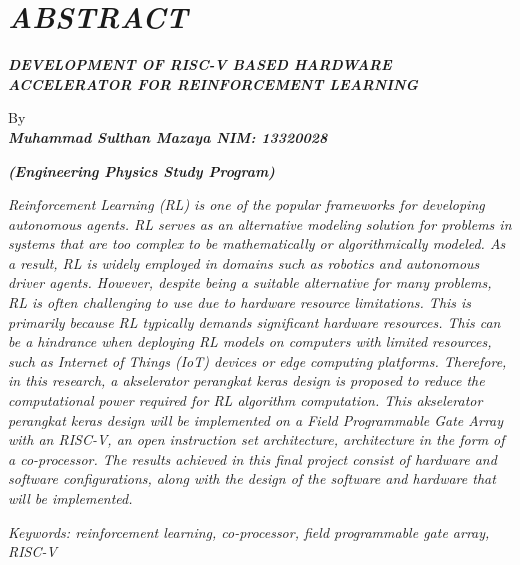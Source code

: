 \clearpage
\chapter*{\textit{ABSTRACT}}

\begin{center}
	\begin{singlespace}
		\center
		\large\bfseries\MakeUppercase{\textit{DEVELOPMENT OF RISC-V BASED HARDWARE ACCELERATOR FOR REINFORCEMENT LEARNING}}
		
		\normalfont\normalsize
		
		By\\
		\bfseries{\textit{Muhammad Sulthan Mazaya \hspace{5mm} NIM: 13320028}}
		
		\vspace{5mm}
		\large\bfseries{\textit{(Engineering Physics Study Program)}}
		\vspace{5mm}
	\end{singlespace}
\end{center}


\begin{singlespace}
	\small
	\textit{Reinforcement Learning (RL) is one of the popular frameworks for developing
		autonomous agents. RL serves as an alternative modeling solution for problems in
		systems that are too complex to be mathematically or algorithmically modeled. As
		a result, RL is widely employed in domains such as robotics and autonomous driver
		agents. However, despite being a suitable alternative for many problems, RL is
		often challenging to use due to hardware resource limitations. This is primarily
		because RL typically demands significant hardware resources. This can be a
		hindrance when deploying RL models on computers with limited resources, such as
		Internet of Things (IoT) devices or edge computing platforms. Therefore, in this
		research, a akselerator perangkat keras design is proposed to reduce the
		computational power required for RL algorithm computation. This akselerator
		perangkat keras design will be implemented on a Field Programmable Gate Array
		with an RISC-V, an open instruction set architecture, architecture in the form of a
		co-processor. The results achieved in this final project consist of hardware and
		software configurations, along with the design of the software and hardware that
		will be implemented.
	}
	
	\textit{Keywords: reinforcement learning, co-processor, field programmable gate array, RISC-V}
\end{singlespace}
\clearpage

\clearpage

